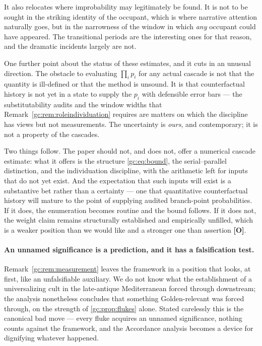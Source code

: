 \begin{remark}
\begin{remark}
It also relocates where improbability may legitimately be found. It is
not to be sought in the striking identity of the occupant, which is
where narrative attention naturally goes, but in the narrowness of the
window in which \emph{any} occupant could have appeared. The
transitional periods are the interesting ones for that reason, and the
dramatic incidents largely are not.
\end{remark}

\begin{remark}
\label{gc:rem:measurement}
One further point about the status of these estimates, and it
cuts in an unusual direction. The obstacle to evaluating $\prod_i p_i$ for any actual cascade is not
that the quantity is ill-defined or that the method is unsound. It is
that counterfactual history is not yet in a state to supply the
$p_i$ with defensible error bars --- the substitutability audits and the
window widths that Remark~\ref{gc:rem:roleindividuation} requires are
matters on which the discipline has views but not measurements. The
uncertainty is \emph{ours}, and contemporary; it is not a property of
the cascades.

Two things follow. The paper should not, and does not, offer a numerical
cascade estimate: what it offers is the structure
\eqref{gc:eq:bound}, the serial--parallel distinction, and the
individuation discipline, with the arithmetic left for inputs that do
not yet exist. And the expectation that such inputs will exist is a
substantive bet rather than a certainty --- one that quantitative
counterfactual history will mature to the point of supplying audited
branch-point probabilities. If it does, the enumeration becomes
routine and the bound follows. If it does not, the weight claim remains
structurally established and empirically unfilled, which is a weaker
position than we would like and a stronger one than assertion
\textbf{[O]}.
\end{remark}

\paragraph{An unnamed significance is a prediction, and it has a
falsification test.}\label{gc:rem:unnamed}
Remark~\ref{gc:rem:measurement} leaves the framework in a position that
looks, at first, like an unfalsifiable auxiliary. We do not know what
the establishment of a universalizing cult in the late-antique
Mediterranean forced through downstream; the analysis nonetheless
concludes that something Golden-relevant was forced through, on the
strength of \ref{gc:prop:flukes} alone. Stated carelessly this is the
canonical bad move --- every fluke acquires an unnamed significance,
nothing counts against the framework, and the Accordance analysis
becomes a device for dignifying whatever happened.


\end{remark}
